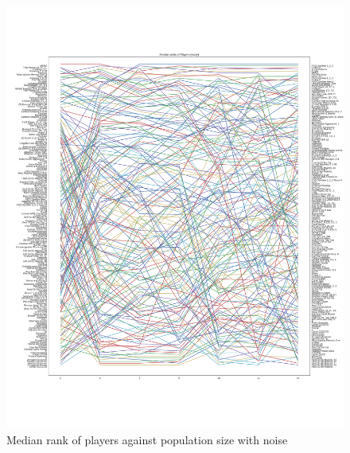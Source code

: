 \documentclass{article}
\begin{document}
\begin{figure}[!hbtp]
    \centering
    \includegraphics[width=\textwidth]{../img/median_rank_vs_population_size_noisy.pdf}
    \caption{Median  rank of players against population size with noise}
    \label{fig:ranks_v_size_noisy}
\end{figure}
\end{document}
